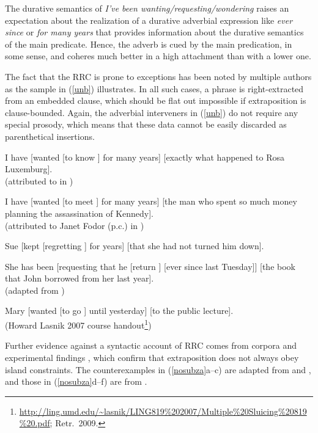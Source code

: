 \documentclass[output=paper
	        ,collection
	        ,collectionchapter
 	        ,biblatex
                ,babelshorthands
                ,newtxmath
                ,draftmode
                ,colorlinks, citecolor=brown
]{langscibook}
\begin{document}
\noindent
The  durative semantics  of   \emph{I've been wanting/requesting/wondering} 
 raises an expectation about the realization of   a durative  
adverbial expression like  \emph{ever since} or \emph{for many years} that
provides information about the durative semantics of the main predicate.
Hence, the adverb is cued by the main predication, in some sense, and 
  coheres much better in a high attachment than with a lower one.

The fact that the RRC is prone to exceptions has been noted by multiple authors as the sample in 
 (\ref{unb}) illustrates. In all such cases, a phrase is right-extracted
 from an embedded clause, which should be flat out impossible if extraposition is clause-bounded. Again, the adverbial  interveners in (\ref{unb}) do not require any special prosody, which means that
  these data cannot be easily discarded as parenthetical insertions.
  
\eal \label{unb}
\ex I have  [wanted [to know \spc] for many years] [exactly what happened to Rosa Luxemburg].\\
(attributed to \citealt{
witten} in \citealt[92n]{postal74})

\ex I have  [wanted [to meet \spc] for many years] [the man who spent so much money planning the assassination of Kennedy].\\
(attributed to Janet Fodor (p.c.) in \citealt[177]{gazdar})

\ex Sue [kept [regretting \spc] for years] [that she had not turned
him down].\\
\citep{eynde96}

\ex She has been [requesting that he [return \spc] [ever since last Tuesday]] [the book
that John borrowed from her last year].\\
(adapted from \citealp[167]{Kayne98a-u})

\ex  Mary [wanted [to go \spc] until yesterday]  [to the public lecture].\\
(Howard Lasnik 2007 course handout\footnote{\url{http://ling.umd.edu/~lasnik/LING819\%202007/Multiple\%20Sluicing\%20819\%20.pdf}; Retr.\ 2009.})
\zl



Further evidence against a syntactic account of RRC comes from  corpora 
\citep{Mueller2004d,Mueller2007c} and experimental findings  \citep{SS2009a-u,strunk}, which confirm
 that  extraposition does  not always obey  island constraints.  The counterexamples in (\ref{nosubza}a--c) are adapted from
 \citet{SS2009a-u} and \citet{strunk}, and those in (\ref{nosubza}d--f) are from \citet[863]{chavesrnr}.
\end{document}
